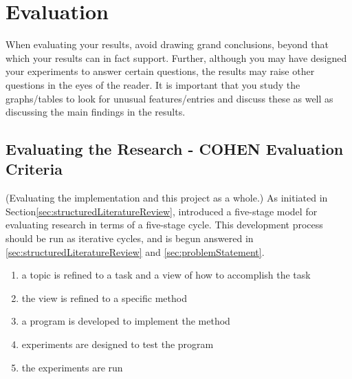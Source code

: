 \section{Evaluation}

When evaluating your results, avoid drawing grand conclusions, beyond that which your results can in fact support. Further, although you may have designed your experiments to answer certain questions, the results may raise other questions in the eyes of the reader. It is important that you study the graphs/tables to look for unusual features/entries and discuss these as well as discussing the main findings in the results. 

\subsection{Evaluating the Research - COHEN Evaluation Criteria}
(Evaluating the implementation and this project as a whole.)
As initiated in Section\vref{sec:structuredLiteratureReview}, \citet{cohen88} introduced a five-stage model for evaluating research in terms of a five-stage cycle. This development process should be run as iterative cycles, and is begun answered in \vref{sec:structuredLiteratureReview} and \vref{sec:problemStatement}.
\begin{enumerate}
\item a topic is refined to a task and a view of how to accomplish the task
\item the view is refined to a specific method
\item a program is developed to implement the method
\item experiments are designed to test the program
\item the experiments are run
\end{enumerate} 

